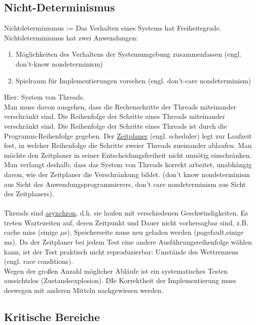 \documentclass[a4paper,12pt]{scrartcl}
\begin{document}
\subsection{Nicht-Determinismus}
Nichtdeterminismus := Das Verhalten eines Systems hat Freiheitsgrade.\\
Nichtdeterminismus hat zwei Anwendungen: 
\begin{enumerate}
 \item Möglichkeiten des Verhaltens der Systemumgebung zusammenfassen (engl. don't-know nondeterminism)
 \item Spielraum für Implementierungen vorsehen (engl. don't-care nondeterminism)
\end{enumerate}
Hier: System von Threads.\\
Man muss davon ausgehen, dass die Rechenschritte der Threads miteinander verschränkt sind. Die Reihenfolge der Schritte eines Threads miteinander verschränkt sind. Die Reihenfolge der Schritte eines Threads ist durch die Programm-Reihenfolge gegeben. Der \underline{Zeitplaner} (engl. scheduler) legt zur Laufzeit fest, in welcher Reihenfolge die Schritte zweier Threads zueinander ablaufen. Man möchte den Zeitplaner in seiner Entscheidungsfreiheit nicht unnötig einschränken. Man verlangt deshalb, dass das System von Threads korrekt arbeitet, unabhängig davon, wie der Zeitplaner die Verschränkung bildet. (don't know nondeterminism aus Sicht des Anwendungsprogrammierers, don't care nondeterminism aus Sicht des Zeitplaners).\\
\\

Threads sind \underline{asynchron}, d.h. sie laufen mit verschiedenen Geschwindigkeiten. Es treten Wartezeiten auf, deren Zeitpunkt und Dauer nicht vorhersagbar sind, z.B. cache miss (einige $\mu$s), Speicherseite muss neu geladen werden (\glqq{}pagefault\grqq{},einige ms). Da der Zeitplaner bei jedem Test eine andere Ausführungsreihenfolge wählen kann, ist der Test praktisch nicht reproduzierbar: Umstände des Wettrennens (engl. race conditions).\\
Wegen der großen Anzahl möglicher Abläufe ist ein systematisches Testen aussichtslos (\glqq{}Zustandsexplosion\grqq{}). DIe Korrektheit der Implementierung muss deswegen mit anderen Mitteln nachgewiesen werden.

\subsection{Kritische Bereiche}
\end{document}
